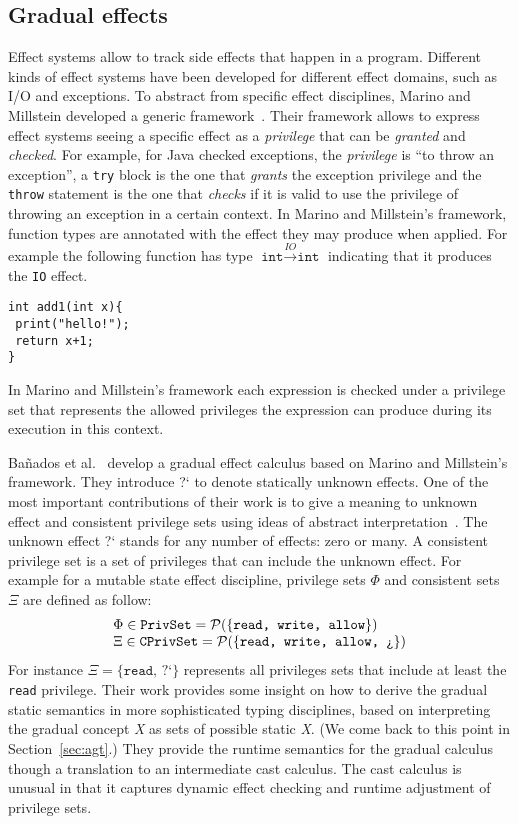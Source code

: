 \documentclass{article}
\newcommand{\quotes}[1]{``#1''}
\newcommand\iqm[0]{?`}
\newcommand\powerset[0]{\mathcal P}
\newcommand\icode[1]{\texttt{#1}}
\begin{document}
\subsection{Gradual effects} 
Effect systems allow to track side effects that happen in a program. Different kinds of effect systems have been developed for different effect domains, such as I/O and exceptions. To abstract from specific effect disciplines, Marino and Millstein developed a generic framework~\cite{marinoMillstein:tldi2009}. Their framework allows to express effect systems seeing a specific effect as a \emph{privilege} that can be \emph{granted} and \emph{checked}. For example, for Java checked exceptions, the \emph{privilege} is \quotes{to throw an exception}, a \icode{try} block is the one that \emph{grants} the exception privilege and the \icode{throw} statement is the one that \emph{checks} if it is valid to use the privilege of throwing an exception in a certain context. In Marino and Millstein's framework, function types are annotated with the effect they may produce when applied. For example the following function has type $\icode{int} \stackrel{IO}{\rightarrow} \icode{int}$ indicating that it produces the \icode{IO} effect.
\begin{lstlisting}[language=Lambda]
int add1(int x){
 print("hello!");
 return x+1;
}
\end{lstlisting}
In Marino and Millstein's framework each expression is checked under a privilege set that represents the allowed privileges the expression can produce during its execution in this context. 

Ba{\~n}ados et al.~\cite{banadosAl:icfp2014} develop a gradual effect calculus based on Marino and Millstein's framework. They introduce \iqm \: to denote statically unknown effects. One of the most important contributions of their work is to give a meaning to unknown effect and consistent privilege sets using ideas of abstract interpretation~\cite{cousot:popl1977}. The unknown effect \iqm \: stands for any number of effects: zero or many. A consistent privilege set is a set of privileges that can include the unknown effect. For example for a mutable state effect discipline, privilege sets $\Phi$ and consistent sets $\Xi$ are defined as follow:
\[
\begin{tabular}{l}
$\Phi \in \texttt{PrivSet} = \powerset(\{\texttt{read, write, allow}\})$\\
$\Xi \in \texttt{CPrivSet} = \powerset(\{\texttt{read, write, allow, \iqm} \})$ 
\end{tabular}
\]
 For instance $\Xi=\{\texttt{read, \iqm}\}$ represents all privileges sets that include at least the \texttt{read} privilege. Their work provides some insight on how to derive the gradual static semantics in more sophisticated typing disciplines, based on interpreting the gradual concept \emph{X} as sets of possible static \emph{X}. (We come back to this point in Section~\ref{sec:agt}.) They provide the runtime semantics for the gradual calculus though a translation to an intermediate cast calculus. The cast calculus is unusual in that it captures dynamic effect checking and runtime adjustment of privilege sets. 
\end{document}
